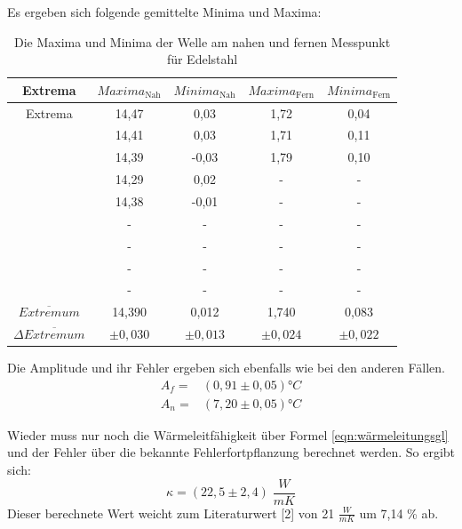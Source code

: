 \documentclass[titlepage = firstcover]{scrartcl}
\begin{document}
  Es ergeben sich folgende gemittelte Minima und Maxima:

  \begin{table}[h]
  \centering
  \caption{Die Maxima und Minima der Welle am nahen und fernen Messpunkt für Edelstahl}
  \label{tab:AmplitudeMes}
  \begin{tabular}{c c c c c}
    \toprule
    {Extrema} & $Maxima_{\text{Nah}}$ & $Minima_{\text{Nah}}$ & $Maxima_{\text{Fern}}$ & $Minima_{\text{Fern}}$ \\
    \midrule
    Extrema &14,47  &0,03  &1,72  &0,04 \\
            &14,41  &0,03  &1,71  &0,11 \\
            &14,39  &-0,03 &1,79  &0,10 \\
            &14,29  &0,02  &-     &- \\
            &14,38  &-0,01 &-     &- \\
            &-      &-     &-     &- \\
            &-      &-     &-     &- \\
            &-      &-     &-     &- \\
            &-      &-     &-     &- \\
  $\overline{Extremum}$ & 14,390 & 0,012  &   1,740  & 0,083 \\
  $\Delta \overline{Extremum}$ & $\pm 0,030 $ & $\pm 0,013$  & $\pm 0,024$  & $\pm 0,022$ \\

    \bottomrule
  \end{tabular}   
  \end{table}
  Die Amplitude und ihr Fehler ergeben sich ebenfalls wie bei den anderen Fällen.
  \begin{align*}
  A_f =& (0,91 \pm 0,05) °C\\
  A_n =& (7,20 \pm 0,05) °C
  \end{align*}

  Wieder muss nur noch die Wärmeleitfähigkeit über Formel \eqref{eqn:wärmeleitungsgl} und der Fehler über die bekannte Fehlerfortpflanzung berechnet werden.
  So ergibt sich:
  \begin{equation*}
  \kappa = (22,5 \pm 2,4) \; \frac{W}{mK}
  \end{equation*}
  Dieser berechnete Wert weicht zum Literaturwert [2] von 21 $\frac{W}{mK}$ um 7,14 \% ab.
\end{document}
